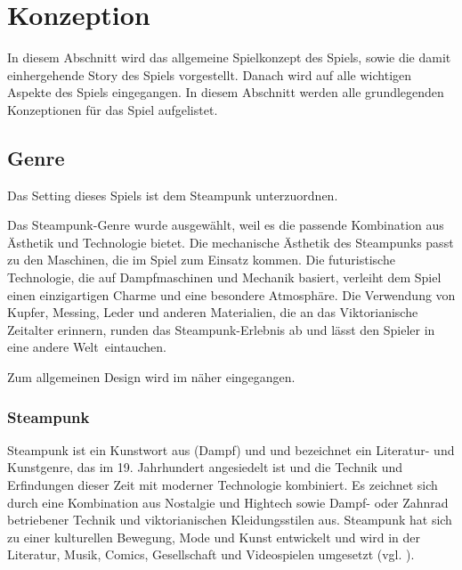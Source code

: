 \chapter{Konzeption}\label{sec:concept}
In diesem Abschnitt wird das allgemeine Spielkonzept des Spiels, sowie die damit einhergehende Story des Spiels vorgestellt. Danach wird auf alle wichtigen Aspekte des Spiels eingegangen. In diesem Abschnitt werden alle grundlegenden Konzeptionen für das Spiel aufgelistet.

\section{Genre}
Das Setting dieses Spiels ist dem Steampunk unterzuordnen.

Das Steampunk-Genre wurde ausgewählt, weil es die passende Kombination aus Ästhetik und Technologie bietet. Die mechanische Ästhetik des Steampunks passt zu den Maschinen, die im Spiel zum Einsatz kommen. Die futuristische Technologie, die auf Dampfmaschinen und Mechanik basiert, verleiht dem Spiel einen einzigartigen Charme und eine besondere Atmosphäre. Die Verwendung von Kupfer, Messing, Leder und anderen Materialien, die an das Viktorianische Zeitalter erinnern, runden das Steampunk-Erlebnis ab und lässt den Spieler in eine andere Welt eintauchen.

Zum allgemeinen Design wird im   näher eingegangen.

\subsection{Steampunk}
Steampunk ist ein Kunstwort aus  (Dampf) und  und bezeichnet ein Literatur- und Kunstgenre, das im 19. Jahrhundert angesiedelt ist und die Technik und Erfindungen dieser Zeit mit moderner Technologie kombiniert. Es zeichnet sich durch eine Kombination aus Nostalgie und Hightech sowie Dampf- oder Zahnrad betriebener Technik und viktorianischen Kleidungsstilen aus. Steampunk hat sich zu einer kulturellen Bewegung, Mode und Kunst entwickelt und wird in der Literatur, Musik, Comics, Gesellschaft und Videospielen umgesetzt (vgl. \cite{noauthor_steampunk_nodate}).

